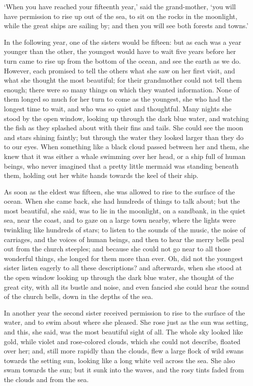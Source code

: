 `When you have reached your fifteenth year,' said the grand-mother, `you will have permission to rise up out of the sea, to sit on the rocks in the moonlight, while the great ships are sailing by; and then you will see both forests and towns.'

In the following year, one of the sisters would be fifteen: but as each was a year younger than the other, the youngest would have to wait five years before her turn came to rise up from the bottom of the ocean, and see the earth as we do.
However, each promised to tell the others what she saw on her first visit, and what she thought the most beautiful; for their grandmother could not tell them enough; there were so many things on which they wanted information.
None of them longed so much for her turn to come as the youngest, she who had the longest time to wait, and who was so quiet and thoughtful.
Many nights she stood by the open window, looking up through the dark blue water, and watching the fish as they splashed about with their fins and tails.
She could see the moon and stars shining faintly; but through the water they looked larger than they do to our eyes.
When something like a black cloud passed between her and them, she knew that it was either a whale swimming over her head, or a ship full of human beings, who never imagined that a pretty little mermaid was standing beneath them, holding out her white hands towards the keel of their ship.

As soon as the eldest was fifteen, she was allowed to rise to the surface of the ocean.
When she came back, she had hundreds of things to talk about; but the most beautiful, she said, was to lie in the moonlight, on a sandbank, in the quiet sea, near the coast, and to gaze on a large town nearby, where the lights were twinkling like hundreds of stars; to listen to the sounds of the music, the noise of carriages, and the voices of human beings, and then to hear the merry bells peal out from the church steeples; and because she could not go near to all those wonderful things, she longed for them more than ever.
Oh, did not the youngest sister listen eagerly to all these descriptions? and afterwards, when she stood at the open window looking up through the dark blue water, she thought of the great city, with all its bustle and noise, and even fancied she could hear the sound of the church bells, down in the depths of the sea.

In another year the second sister received permission to rise to the surface of the water, and to swim about where she pleased.
She rose just as the sun was setting, and this, she said, was the most beautiful sight of all.
The whole sky looked like gold, while violet and rose-colored clouds, which she could not describe, floated over her; and, still more rapidly than the clouds, flew a large flock of wild swans towards the setting sun, looking like a long white veil across the sea.
She also swam towards the sun; but it sunk into the waves, and the rosy tints faded from the clouds and from the sea.

